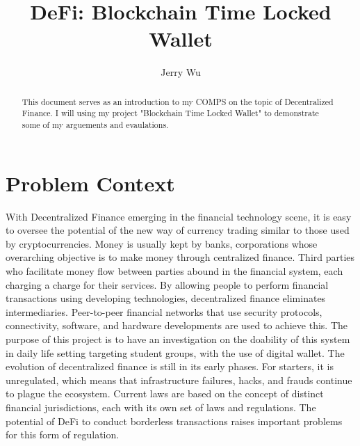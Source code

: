\documentclass[10pt,twocolumn]{article}
\title{DeFi: Blockchain Time Locked Wallet}
\author{Jerry Wu}
\affiliation{Occidental College}
\begin{document}
\maketitle

\begin{abstract}
    This document serves as an introduction to my COMPS on the topic of Decentralized Finance. I will using my project "Blockchain Time Locked Wallet" to demonstrate
    some of my arguements and evaulations.
\end{abstract}

\section{Problem Context}

With Decentralized Finance emerging in the financial technology scene, it is easy to oversee the potential of the new way of currency trading similar to those used by cryptocurrencies. Money is usually kept by banks, corporations whose overarching objective is to make money through centralized finance. Third parties who facilitate money flow between parties abound in the financial system, each charging a charge for their services. By allowing people to perform financial transactions using developing technologies, decentralized finance eliminates intermediaries. Peer-to-peer financial networks that use security protocols, connectivity, software, and hardware developments are used to achieve this. The purpose of this project is to have an investigation on the doability of this system in daily life setting targeting student groups, with the use of digital wallet.
The evolution of decentralized finance is still in its early phases. For starters, it is unregulated, which means that infrastructure failures, hacks, and frauds continue to plague the ecosystem. Current laws are based on the concept of distinct financial jurisdictions, each with its own set of laws and regulations. The potential of DeFi to conduct borderless transactions raises important problems for this form of regulation.
\end{document}
